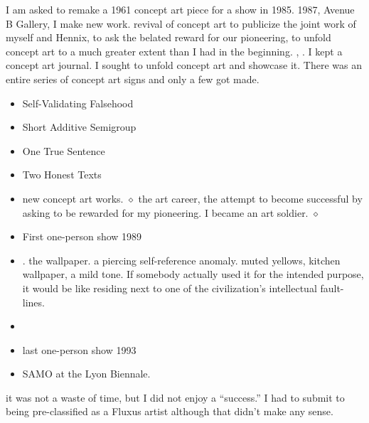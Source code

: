 
	I am asked to remake a 1961 concept art piece for a show in 1985.  1987, Avenue B Gallery, I make new work.  revival of concept art to publicize the joint work of myself and Hennix, to ask the belated reward for our pioneering, to unfold concept art to a much greater extent than I had in the beginning. , .  I kept a concept art journal.  I sought to unfold concept art and showcase it.  There was an entire series of concept art signs and only a few got made.
\begin{itemize}
\item Self-Validating Falsehood
\item Short Additive Semigroup
\item One True Sentence
\item Two Honest Texts
\end{itemize}

\begin{itemize}
\item {} new concept art works.  $\diamond$ the art career, the attempt to become successful by asking to be rewarded for my pioneering.  I became an art soldier. $\diamond$

\item First one-person show 1989

\item  {}.  the wallpaper.  a piercing self-reference anomaly.  muted yellows, kitchen wallpaper, a mild tone.  If somebody actually used it for the intended purpose, it would be like residing next to one of the civilization's intellectual fault-lines.

\item {}

\item last one-person show 1993

\item SAMO\scalebox{1.2}{©} at the Lyon Biennale.
\end{itemize}

it was not a waste of time, but I did not enjoy a \enquote{success.}   I had to submit to being pre-classified as a Fluxus artist although that didn't make any sense.

